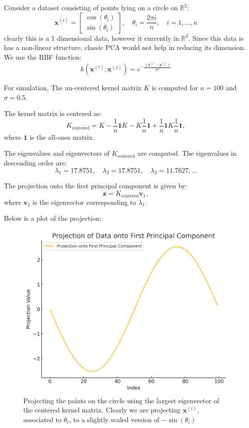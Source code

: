 \documentclass{article}
\begin{document}
\begin{example}
Consider a dataset consisting of points lying on a circle on $\mathbb{R}^{2}$:
\[
  \bm{x}^{(i)} = \begin{bmatrix} \cos(\theta_i) \\ \sin(\theta_i) \end{bmatrix},  \quad  \theta_i = \frac{2 \pi i}{n}, \quad i=1,\ldots, n
\]
clearly this is a 1 dimensional data, however it currently in $\mathbb{R}^{2}$. Since this data is has a non-linear structure, classic PCA would not help in reducing its dimension. We use the RBF function:
\[
  k(\bm{x}^{(i)}, \bm{x}^{(j)}) = e^{- \frac{\lVert \bm{x}^{(i)} - \bm{x}^{(j)} \rVert }{2 \sigma ^2}} 
\]


For simulation, The un-centered kernel matrix \( K \) is computed for \( n = 100 \) and \( \sigma = 0.5 \).

The kernel matrix is centered as:
\[
  K_\text{centered} = K - \frac{1}{n} \bm{1} K - K \frac{1}{n} \bm{1} + \frac{1}{n} \bm{1} K \frac{1}{n} \bm{1},
\]
where \( \bm{1} \) is the all-ones matrix.

The eigenvalues and eigenvectors of \( K_\text{centered} \) are computed. The eigenvalues in descending order are:
\[
  \lambda_1 = 17.8751, \quad \lambda_2 = 17.8751, \quad \lambda_3 = 11.7627, \ldots
\]

The projection onto the first principal component is given by:
\[
  \bm{z} = K_\text{centered} \bm{v}_1,
\]
where \( \bm{v}_1 \) is the eigenvector corresponding to \( \lambda_1 \).

Below is a plot of the projection:
  \begin{figure}[H] \centering \includegraphics[height=0.2\textheight]{rbfProjection} \caption{Projecting the points on the circle using the largest eigenvector of the centered kernel matrix. Clearly we are projecting $\bm{x}^{(i)}$, associated to $\theta_i$, to a slightly scaled version of $-\sin(\theta_i)$} \label{fig:rbfProjection} \end{figure}
\end{example}
\end{document}
